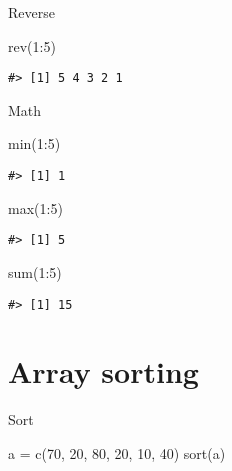 \documentclass[
]{book}
\newenvironment{Shaded}{\begin{snugshade}}{\end{snugshade}}
\newcommand{\DecValTok}[1]{\textcolor[rgb]{0.00,0.00,0.81}{#1}}
\newcommand{\FunctionTok}[1]{\textcolor[rgb]{0.00,0.00,0.00}{#1}}
\newcommand{\NormalTok}[1]{#1}
\newcommand{\OtherTok}[1]{\textcolor[rgb]{0.56,0.35,0.01}{#1}}
\newcommand{\SpecialCharTok}[1]{\textcolor[rgb]{0.00,0.00,0.00}{#1}}
\begin{document}
Reverse

\begin{Shaded}
\begin{Highlighting}[]
\FunctionTok{rev}\NormalTok{(}\DecValTok{1}\SpecialCharTok{:}\DecValTok{5}\NormalTok{)}
\end{Highlighting}
\end{Shaded}

\begin{verbatim}
#> [1] 5 4 3 2 1
\end{verbatim}

Math

\begin{Shaded}
\begin{Highlighting}[]
\FunctionTok{min}\NormalTok{(}\DecValTok{1}\SpecialCharTok{:}\DecValTok{5}\NormalTok{)}
\end{Highlighting}
\end{Shaded}

\begin{verbatim}
#> [1] 1
\end{verbatim}

\begin{Shaded}
\begin{Highlighting}[]
\FunctionTok{max}\NormalTok{(}\DecValTok{1}\SpecialCharTok{:}\DecValTok{5}\NormalTok{)}
\end{Highlighting}
\end{Shaded}

\begin{verbatim}
#> [1] 5
\end{verbatim}

\begin{Shaded}
\begin{Highlighting}[]
\FunctionTok{sum}\NormalTok{(}\DecValTok{1}\SpecialCharTok{:}\DecValTok{5}\NormalTok{)}
\end{Highlighting}
\end{Shaded}

\begin{verbatim}
#> [1] 15
\end{verbatim}

\hypertarget{array-sorting}{%
\section{Array sorting}\label{array-sorting}}

Sort

\begin{Shaded}
\begin{Highlighting}[]
\NormalTok{a }\OtherTok{=} \FunctionTok{c}\NormalTok{(}\DecValTok{70}\NormalTok{, }\DecValTok{20}\NormalTok{, }\DecValTok{80}\NormalTok{, }\DecValTok{20}\NormalTok{, }\DecValTok{10}\NormalTok{, }\DecValTok{40}\NormalTok{)}
\FunctionTok{sort}\NormalTok{(a)}
\end{Highlighting}
\end{Shaded}
\end{document}
